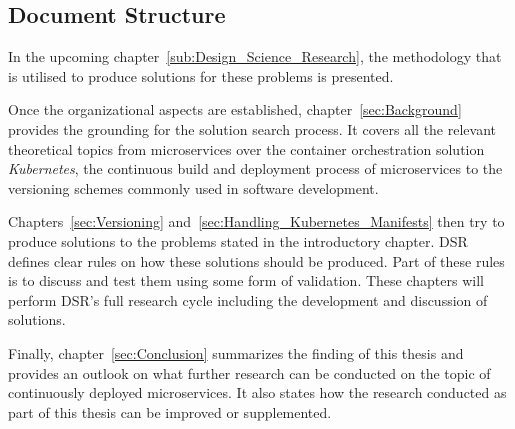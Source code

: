 
\subsection{Document Structure}%
\label{sub:Document Structure}

In the upcoming chapter~\ref{sub:Design_Science_Research}, the methodology that
is utilised to produce solutions for these problems is presented.

Once the organizational aspects are established, chapter~\ref{sec:Background}
provides the grounding for the solution search process. It covers all the
relevant theoretical topics from microservices over the container orchestration
solution \textit{Kubernetes}, the continuous build and deployment process of
microservices to the versioning schemes commonly used in software development.

Chapters~\ref{sec:Versioning} and~\ref{sec:Handling_Kubernetes_Manifests} then
try to produce solutions to the problems stated in the introductory chapter.
\acf{DSR} defines clear rules on how these solutions should be produced. Part
of these rules is to discuss and test them using some form of validation. These
chapters will perform \acs{DSR}'s full research cycle including the development
and discussion of solutions.

Finally, chapter~\ref{sec:Conclusion} summarizes the finding of this thesis and
provides an outlook on what further research can be conducted on the topic of
continuously deployed microservices. It also states how the research conducted
as part of this thesis can be improved or supplemented.
